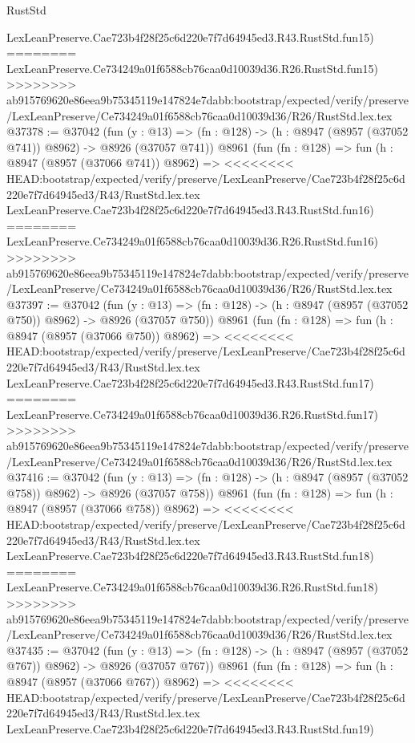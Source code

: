 \begin{lexlean}{RustStd}
\begin{coremodule}
{\begin{coremodule}
{{{{{{{{{{{{{{{{{{{{{{{{{{{{{{{{{{{{{{{    LexLeanPreserve.Cae723b4f28f25c6d220e7f7d64945ed3.R43.RustStd.fun15)
========
    LexLeanPreserve.Ce734249a01f6588cb76caa0d10039d36.R26.RustStd.fun15)
>>>>>>>> ab915769620e86eea9b75345119e147824e7dabb:bootstrap/expected/verify/preserve/LexLeanPreserve/Ce734249a01f6588cb76caa0d10039d36/R26/RustStd.lex.tex
@37378 := @37042
    (fun (y : @13) => (fn : @128) -> (h : @8947 (@8957 (@37052 @741)) @8962) -> @8926 (@37057 @741))
    @8961
    (fun (fn : @128) =>
    fun (h : @8947 (@8957 (@37066 @741)) @8962) =>
<<<<<<<< HEAD:bootstrap/expected/verify/preserve/LexLeanPreserve/Cae723b4f28f25c6d220e7f7d64945ed3/R43/RustStd.lex.tex
    LexLeanPreserve.Cae723b4f28f25c6d220e7f7d64945ed3.R43.RustStd.fun16)
========
    LexLeanPreserve.Ce734249a01f6588cb76caa0d10039d36.R26.RustStd.fun16)
>>>>>>>> ab915769620e86eea9b75345119e147824e7dabb:bootstrap/expected/verify/preserve/LexLeanPreserve/Ce734249a01f6588cb76caa0d10039d36/R26/RustStd.lex.tex
@37397 := @37042
    (fun (y : @13) => (fn : @128) -> (h : @8947 (@8957 (@37052 @750)) @8962) -> @8926 (@37057 @750))
    @8961
    (fun (fn : @128) =>
    fun (h : @8947 (@8957 (@37066 @750)) @8962) =>
<<<<<<<< HEAD:bootstrap/expected/verify/preserve/LexLeanPreserve/Cae723b4f28f25c6d220e7f7d64945ed3/R43/RustStd.lex.tex
    LexLeanPreserve.Cae723b4f28f25c6d220e7f7d64945ed3.R43.RustStd.fun17)
========
    LexLeanPreserve.Ce734249a01f6588cb76caa0d10039d36.R26.RustStd.fun17)
>>>>>>>> ab915769620e86eea9b75345119e147824e7dabb:bootstrap/expected/verify/preserve/LexLeanPreserve/Ce734249a01f6588cb76caa0d10039d36/R26/RustStd.lex.tex
@37416 := @37042
    (fun (y : @13) => (fn : @128) -> (h : @8947 (@8957 (@37052 @758)) @8962) -> @8926 (@37057 @758))
    @8961
    (fun (fn : @128) =>
    fun (h : @8947 (@8957 (@37066 @758)) @8962) =>
<<<<<<<< HEAD:bootstrap/expected/verify/preserve/LexLeanPreserve/Cae723b4f28f25c6d220e7f7d64945ed3/R43/RustStd.lex.tex
    LexLeanPreserve.Cae723b4f28f25c6d220e7f7d64945ed3.R43.RustStd.fun18)
========
    LexLeanPreserve.Ce734249a01f6588cb76caa0d10039d36.R26.RustStd.fun18)
>>>>>>>> ab915769620e86eea9b75345119e147824e7dabb:bootstrap/expected/verify/preserve/LexLeanPreserve/Ce734249a01f6588cb76caa0d10039d36/R26/RustStd.lex.tex
@37435 := @37042
    (fun (y : @13) => (fn : @128) -> (h : @8947 (@8957 (@37052 @767)) @8962) -> @8926 (@37057 @767))
    @8961
    (fun (fn : @128) =>
    fun (h : @8947 (@8957 (@37066 @767)) @8962) =>
<<<<<<<< HEAD:bootstrap/expected/verify/preserve/LexLeanPreserve/Cae723b4f28f25c6d220e7f7d64945ed3/R43/RustStd.lex.tex
    LexLeanPreserve.Cae723b4f28f25c6d220e7f7d64945ed3.R43.RustStd.fun19)
}}}}}}}}}}}}}}}}}}}}}}}}}}}}}}}}}}}}}}}
\end{coremodule}}
\end{coremodule}
\end{lexlean}

